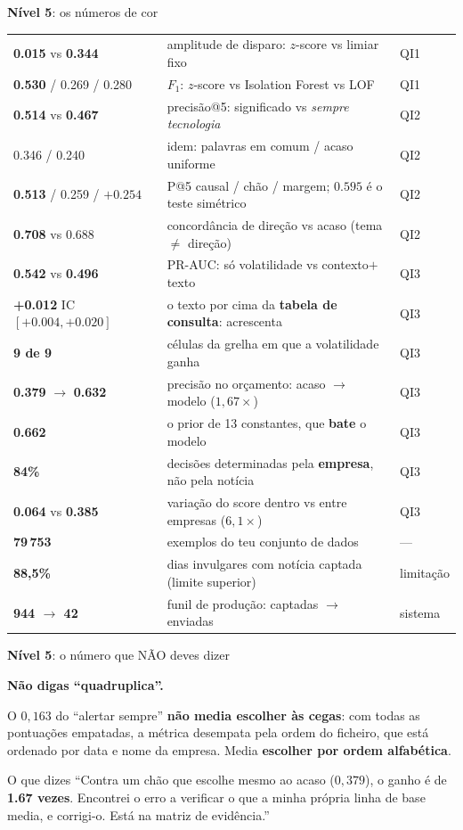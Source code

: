 \documentclass[aspectratio=169]{beamer}
\newcommand{\key}[1]{\textbf{\textcolor{blue!55!black}{#1}}}
\begin{document}
\begin{frame}{\key{Nível 5}: os números de cor}
\centering
\small
\begin{tabular}{lll}
\toprule
\key{0.015} vs \key{0.344} & amplitude de disparo: $z$-score vs limiar fixo & QI1 \\
\key{0.530} / 0.269 / 0.280 & $F_1$: $z$-score vs Isolation Forest vs LOF & QI1 \\
\key{0.514} vs \key{0.467} & precisão@5: significado vs \emph{sempre tecnologia} & QI2 \\
0.346 / 0.240 & idem: palavras em comum / acaso uniforme & QI2 \\
\key{0.513} / 0.259 / $+0.254$ & P@5 causal / chão / margem; $0.595$ é o teste simétrico & QI2 \\
\key{0.708} vs 0.688 & concordância de direção vs acaso (tema $\neq$ direção) & QI2 \\
\key{0.542} vs \key{0.496} & PR-AUC: só volatilidade vs contexto$+$texto & QI3 \\
\key{+0.012} IC $[+0.004, +0.020]$ & o texto por cima da \textbf{tabela de consulta}: acrescenta & QI3 \\
\key{9 de 9} & células da grelha em que a volatilidade ganha & QI3 \\
\key{0.379} $\to$ \key{0.632} & precisão no orçamento: acaso $\to$ modelo ($1{,}67\times$) & QI3 \\
\key{0.662} & o prior de 13 constantes, que \textbf{bate} o modelo & QI3 \\
\key{84\%} & decisões determinadas pela \textbf{empresa}, não pela notícia & QI3 \\
\key{0.064} vs \key{0.385} & variação do score dentro vs entre empresas ($6{,}1\times$) & QI3 \\
\key{79\,753} & exemplos do teu conjunto de dados & --- \\
\key{88,5\%} & dias invulgares com notícia captada (limite superior) & limitação \\
\key{944 $\to$ 42} & funil de produção: captadas $\to$ enviadas & sistema \\
\bottomrule
\end{tabular}
\end{frame}

\begin{frame}{\key{Nível 5}: o número que NÃO deves dizer}
\begin{center}
\Large \textbf{Não digas ``quadruplica''.}
\end{center}
\vspace{4mm}
O $0{,}163$ do ``alertar sempre'' \textbf{não media escolher às cegas}: com todas as pontuações
empatadas, a métrica desempata pela ordem do ficheiro, que está ordenado por data e nome da
empresa. Media \textbf{escolher por ordem alfabética}.
\vspace{3mm}
\begin{block}{O que dizes}
``Contra um chão que escolhe mesmo ao acaso ($0{,}379$), o ganho é de \textbf{1.67 vezes}. Encontrei
o erro a verificar o que a minha própria linha de base media, e corrigi-o. Está na matriz de
evidência.''
\end{block}
\end{frame}
\end{document}
